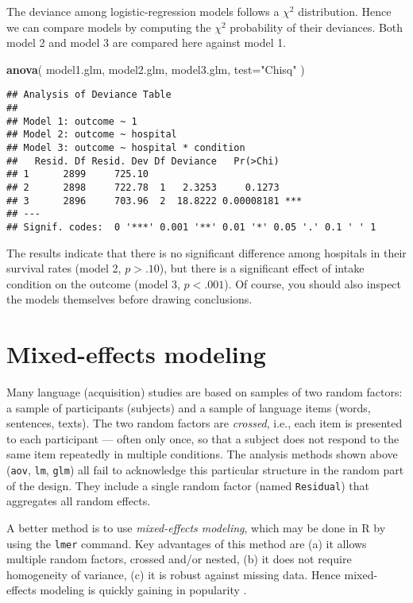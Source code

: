 \documentclass[]{book}
\newenvironment{Shaded}{\begin{snugshade}}{\end{snugshade}}
\newcommand{\DataTypeTok}[1]{\textcolor[rgb]{0.13,0.29,0.53}{#1}}
\newcommand{\KeywordTok}[1]{\textcolor[rgb]{0.13,0.29,0.53}{\textbf{#1}}}
\newcommand{\NormalTok}[1]{#1}
\newcommand{\StringTok}[1]{\textcolor[rgb]{0.31,0.60,0.02}{#1}}
\begin{document}
The deviance among logistic-regression models follows a \(\chi^2\)
distribution. Hence we can compare models by computing the \(\chi^2\)
probability of their deviances. Both model 2 and model 3
are compared here against model 1.

\begin{Shaded}
\begin{Highlighting}[]
\KeywordTok{anova}\NormalTok{( model1.glm, model2.glm, model3.glm, }\DataTypeTok{test=}\StringTok{"Chisq"}\NormalTok{ ) }
\end{Highlighting}
\end{Shaded}

\begin{verbatim}
## Analysis of Deviance Table
## 
## Model 1: outcome ~ 1
## Model 2: outcome ~ hospital
## Model 3: outcome ~ hospital * condition
##   Resid. Df Resid. Dev Df Deviance   Pr(>Chi)    
## 1      2899     725.10                           
## 2      2898     722.78  1   2.3253     0.1273    
## 3      2896     703.96  2  18.8222 0.00008181 ***
## ---
## Signif. codes:  0 '***' 0.001 '**' 0.01 '*' 0.05 '.' 0.1 ' ' 1
\end{verbatim}

The results indicate that there is no significant difference among
hospitals in their survival rates (model 2, \(p>.10\)), but there is a
significant effect of intake condition on the outcome (model 3,
\(p<.001\)). Of course, you should also inspect the models themselves
before drawing conclusions.

\hypertarget{ch:mixedeffects}{%
\chapter{Mixed-effects modeling}\label{ch:mixedeffects}}

Many language (acquisition) studies are based on samples of two random
factors: a sample of participants (subjects) and a sample of language
items (words, sentences, texts). The two random factors are \emph{crossed},
i.e., each item is presented to each participant --- often only once, so
that a subject does not respond to the same item repeatedly in multiple
conditions. The analysis methods shown above
(\texttt{aov}, \texttt{lm},
\texttt{glm}) all fail to acknowledge this particular
structure in the random part of the design. They include a single random
factor (named \texttt{Residual}) that aggregates all
random effects.

A better method is to use \emph{mixed-effects modeling},
which may be done in R by using the \texttt{lmer} command. Key
advantages of this method are (a) it allows multiple random
factors, crossed and/or nested, (b) it does not require homogeneity of
variance, (c) it is robust against missing data. Hence mixed-effects
modeling is quickly gaining in popularity
\citep{QB04, QB08, baay08, HMS18}.
\end{document}

